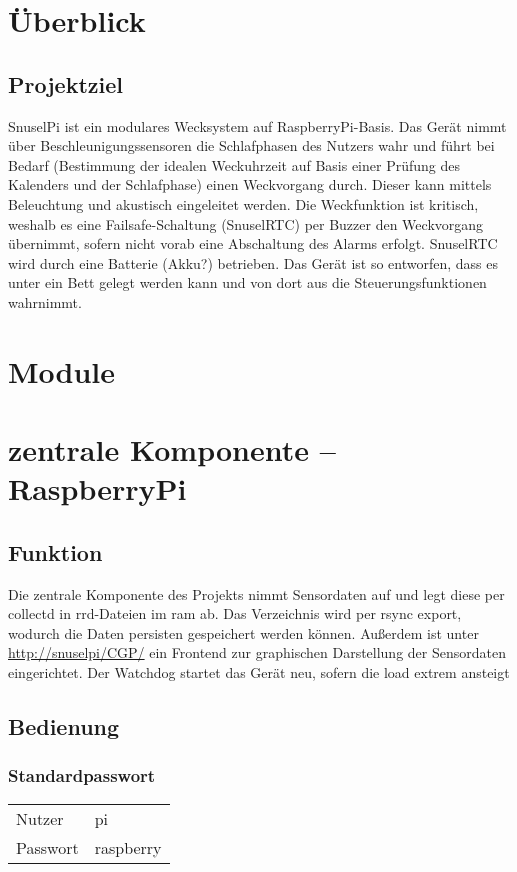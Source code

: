 \documentclass[a4paper,twoside,titlepage,normalheadings,tocleft,bibtotoc]{scrartcl}
\begin{document}
%
\tableofcontents
\newpage

\section{Überblick}
\subsection{Projektziel}
SnuselPi ist ein modulares Wecksystem auf RaspberryPi-Basis. Das Gerät nimmt über Beschleunigungssensoren die Schlafphasen des Nutzers wahr und führt bei Bedarf (Bestimmung der idealen Weckuhrzeit auf Basis einer Prüfung des Kalenders und der Schlafphase) einen Weckvorgang durch. Dieser kann mittels Beleuchtung und akustisch eingeleitet werden. Die Weckfunktion ist kritisch, weshalb es eine Failsafe-Schaltung (SnuselRTC) per Buzzer den Weckvorgang übernimmt, sofern nicht vorab eine Abschaltung des Alarms erfolgt. SnuselRTC wird durch eine Batterie (Akku?) betrieben.
Das Gerät ist so entworfen, dass es unter ein Bett gelegt werden kann und von dort aus die Steuerungsfunktionen wahrnimmt.
\section{Module}
\section{zentrale Komponente -- RaspberryPi}
\subsection{Funktion}
Die zentrale Komponente des Projekts nimmt Sensordaten auf und legt diese per collectd in rrd-Dateien im ram ab. Das Verzeichnis wird per rsync export, wodurch die Daten persisten gespeichert werden können. Außerdem ist unter \url{http://snuselpi/CGP/} ein Frontend zur graphischen Darstellung der Sensordaten eingerichtet. Der Watchdog startet das Gerät neu, sofern die load extrem ansteigt

\subsection{Bedienung}
\subsubsection{Standardpasswort}
\begin{tabular}{ll}
Nutzer & pi \\
Passwort & raspberry \\
\end{tabular}
\end{document}
